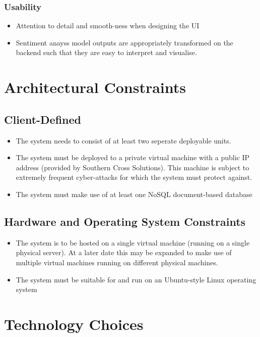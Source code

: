 \documentclass[12pt]{article}
\begin{document}
\subsubsection{Usability}
\begin{itemize}
    \item Attention to detail and smooth-ness when designing the UI
    \item Sentiment anayss model outputs are appropriately transformed on the backend such that they are easy to interpret and visualise.
\end{itemize}



\section{Architectural Constraints}
\subsection{Client-Defined}
\begin{itemize}
    \item The system needs to consist of at least two seperate deployable units.
    \item The system must be deployed to a private virtual machine with a public IP address (provided by Southern Cross Solutions). This machine is subject to extremely frequent cyber-attacks for which the system must protect against.
    \item The system must make use of at least one NoSQL document-based database
\end{itemize}
\subsection{Hardware and Operating System Constraints}
\begin{itemize}
    \item The system is to be hosted on a single virtual machine (running on a single physical server). At a later date this may be expanded to make use of multiple virtual machines running on different physical machines.
    \item The system must be suitable for and run on an Ubuntu-style Linux operating system
\end{itemize}


\section{Technology Choices}
\end{document}
